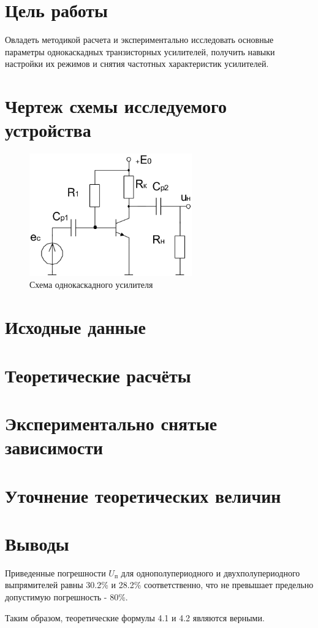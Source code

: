 






\section{Цель работы}

Овладеть методикой расчета и экспериментально исследовать основные параметры однокаскадных транзисторных усилителей, получить навыки настройки их режимов и снятия частотных характеристик усилителей.


\section{Чертеж схемы исследуемого устройства}

\begin{figure}[H]
	\begin{center}
	\vspace{-0.5cm}
		\includegraphics[width=7cm]{img/scheme}
		\caption{Схема однокаскадного усилителя}
		\label{figure:1.1}
	\vspace{-0.5cm}
	\end{center}
\end{figure}

\section{Исходные данные}

\section{Теоретические расчёты}

\section{Экспериментально снятые зависимости}

\section{Уточнение теоретических величин}

\section{Выводы}

 Приведенные погрешности $U_\text{п}$ для однополупериодного и двухполупериодного выпрямителей равны 30.2\% и 28.2\% соответственно, что не превышает предельно допустимую погрешность - 80\%.

Таким образом, теоретические формулы 4.1 и 4.2 являются верными.


